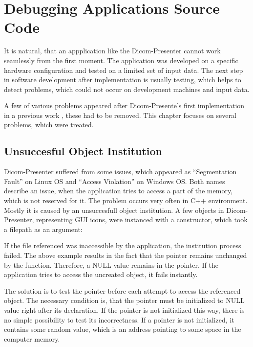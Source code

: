 \chapter{Debugging Applications Source Code}
\vspace{-10mm}
It is natural, that an appplication like the Dicom-Presenter cannot work seamlessly from the first moment. The application was developed on a specific hardware configuration and tested on a limited set of input data. The next step in software development after implementation is usually testing, which helps to detect problems, which could not occur on development machines and input data.

A few of various problems appeared after Dicom-Presente's first implementation in a previous work \cite{neskudla}, these had to be removed. This chapter focuses on several problems, which were treated.

\section{Unsuccesful Object Institution}
Dicom-Presenter suffered from some issues, which appeared as ``Segmentation Fault'' on Linux OS and ``Access Violation'' on Windows OS. Both names describe an issue, when the application tries to access a part of the memory, which is not reserved for it. The problem occurs very often in C++ environment. Mostly it is caused by an unsuccesfull object institution. A few objects in Dicom-Presenter, representing GUI icons, were instanced with a constructor, which took a filepath as an argument:


If the file referenced was inaccessible by the application, the institution process failed. The above example results in the fact that the  pointer remains unchanged by the  function. Therefore, a NULL value remains in the pointer. If the application tries to access the uncreated object, it fails instantly.

The solution is to test the pointer before each attempt to access the referenced object. The necessary condition is, that the pointer  must be initialized to NULL value right after its declaration. If the pointer is not initialized this way, there is no simple possibility to test its incorrectness. If a pointer is not initialized, it contains some random value, which is an address pointing to some space in the computer memory.

